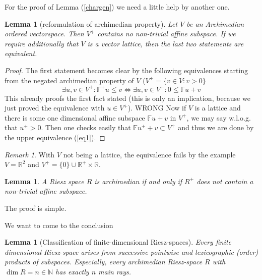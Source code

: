 \message{ !name(OnOrderConvergence.tex)}\documentclass{article}
\newtheorem{lemma}[theorem]{Lemma}
\theoremstyle{definition}
\theoremstyle{remark}
\newtheorem{remark}[theorem]{Remark}
\newcommand{\reels}{\mathbb{R}}  %
\newcommand{\nats}{\mathbb{N}} %
\newcommand{\field}{\mathbb{F}}
\newcommand{\equival}{\Leftrightarrow}
\begin{document}
For the proof of Lemma (\ref{chargen}) we need a little help by another one.

\begin{lemma}[reformulation of archimedian property] Let $V$ be an Archimedian ordered vectorspace. Then $V^+$ contains no non-trivial affine subspace. If we require additionally that $V$ is a vector lattice, then the last two statements are equivalent. 
\end{lemma}

\begin{proof}
The first statement becomes clear by the following equivalences starting from the negated archimedian property of $V$ ($V^+=\{v\in V:v>0\}$
\begin{equation}
{\exists u,v\in V^+:\field^+ u \leq v}\equival {\exists u,v\in V^+:0\leq \field u + v}\label{eq1}
\end{equation}
This already proofs the first fact stated (this is only an implication, because we just proved the equivalence with $u\in V^+$). WRONG Now if $V$ is a lattice and there is some one dimensional affine subspace $\field u+v$ in $V^+$, we may say w.l.o.g. that $u^+>0$. Then one checks easily that $\field u^+ + v\subset V^+$ and thus we are done by the upper equivalence (\ref{eq1}).  
\end{proof}

\begin{remark}
With $V$ not being a lattice, the equivalence fails by the example $V=\reels^2$ and $V^+=\{0\}\cup \reels^+\times \reels$.
\end{remark}

\begin{lemma}
A Riesz space $R$ is archimedian if and only if $R^+$ does not contain a non-trivial affine subspace.
\end{lemma}

The proof is simple.

We want to come to the conclusion 

\begin{lemma}[Classification of finite-dimensional Riesz-spaces] Every finite dimensional Riesz-space arises from successive pointwise and lexicographic (order) products of subspaces. Especially, every archimedian Riesz-space $R$ with $\dim{R}=n\in\nats$ has exactly $n$ main rays.
\end{lemma}
\end{document}
